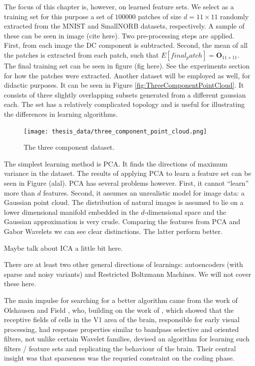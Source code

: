 \documentclass[12pt,a4paper,oneside,english]{UPBThesis}
\newcommand{\hctimes}[2]{{#1}\!\times\!{#2}}
\begin{document}
The focus of this chapter is, however, on learned feature sets. We select as a training set for this purpose a set of $100000$ patches of size $d = \hctimes{11}{11}$ randomly extracted from the MNIST and SmallNORB datasets, respectively. A sample of these can be seen in image (cite here). Two pre-processing steps are applied. First, from each image the DC component is subtracted. Second, the mean of all the patches is extracted from each patch, such that $E[final_patch] = \textbf{O}_{\hctimes{11}{11}}$. The final training set can be seen in figure (fig here). See the experiments section for how the patches were extracted. Another dataset will be employed as well, for didactic purposes. It can be seen in Figure \ref{fig:ThreeComponentPointCloud}. It consists of three slightly overlapping subsets generated from a different gaussian each. The set has a relatively complicated topology and is useful for illustrating the differences in learning algorithms.

\begin{figure}
\centering
\texttt{[image: thesis\_data/three\_component\_point\_cloud.png]}
\caption{The three component dataset.}
\label{fig:ThreeComponentPointColud}
\end{figure}

The simplest learning method is PCA. It finds the directions of maximum variance in the dataset. The results of applying PCA to learn a feature set can be seen in Figure (alal). PCA has several problems however. First, it cannot ``learn'' more than $d$ features. Second, it assumes an unrealistic model for image data: a Gaussian point cloud. The distribution of natural images is assumed to lie on a lower dimensional manifold embedded in the $d$-dimensional space and the Gaussian approximation is very crude. Comparing the features from PCA and Gabor Wavelets we can see clear distinctions. The latter perform better.

Maybe talk about ICA a little bit here.

There are at least two other general directions of learnings: autoencoders (with sparse and noisy variants) and Restricted Boltzmann Machines. We will not cover these here.

The main impulse for searching for a better algorithm came from the work of Olshausen and Field \cite{emergence-sparse-coding,sparse-coding-strategy-V1}, who, building on the work of \cite{macaque-cortex}, which showed that the receptive fields of cells in the V1 area of the brain, responsible for early visual processing, had response properties similar to bandpass selective and oriented filters, not unlike certain Wavelet families, devised an algorithm for learning such filters / feature sets and replicating the behaviour of the brain. Their central insight was that sparseness was the requried constraint on the coding phase.
\end{document}
